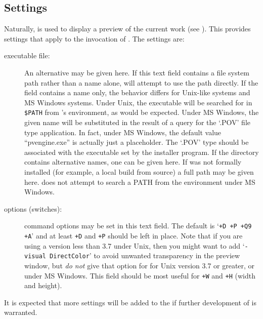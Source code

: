 		\subsection{\dtypovhdr{} Settings}%
		\label{ssec:prefs_povray}
		Naturally, \IXpov{} is used to display a preview of
		the current work (see ).
		This  provides settings that apply to
		the invocation of \IXpov{}.
		The \IXpov{} settings are:

			\begin{description}
			  \item[\IXpov{} executable file:] An alternative may
			  be given here. If this text field contains a file system
			  path rather than a name alone, \IXpkg{} will attempt
			  to use the path directly. If the field contains a name
			  only, the behavior differs for Unix-like systems and
			  MS Windows systems. Under Unix, the executable will be
			  searched for in \texttt{\$PATH} from \IXpkg{}'s
			  environment, as would be expected. Under MS Windows,
			  the given name will be substituted in the result of
			  a query for the `.POV' file type application. In fact,
			  under MS Windows, the default value ``pvengine.exe'' is
			  actually just a placeholder. The `.POV' type should
			  be associated with the executable set by the \IXpov{}
			  installer program. If the \IXpov{} directory contains
			  alternative names, one can be given here. If \IXpov{}
			  was not formally installed (for example, a local build
			  from source) a full path may be given here. \IXpkgu{}
			  does not attempt to search a PATH from the environment
			  under MS Windows.
			  \item[\IXpov{} options (switches):] \IXpov{} command
			  options may be set in this text field. The default
			  is `\texttt{+D +P +Q9 +A}' and at least
			  \texttt{+D} and \texttt{+P} should be left in place.
			  Note that if you are using a \IXpov{} version less
			  than 3.7 under Unix, then you might want to add
			  `\texttt{-visual DirectColor}' to avoid unwanted
			  transparency in the preview window, but \emph{do not}
			  give that option for \IXpov{} for Unix version 3.7 or
			  greater, or under MS Windows. This field should be most
			  useful for \texttt{+W} and \texttt{+H}
			  (width and height).
			\end{description}

	It is expected that more settings will be added to the
	  if further development
	of \IXpkg{} is warranted.

